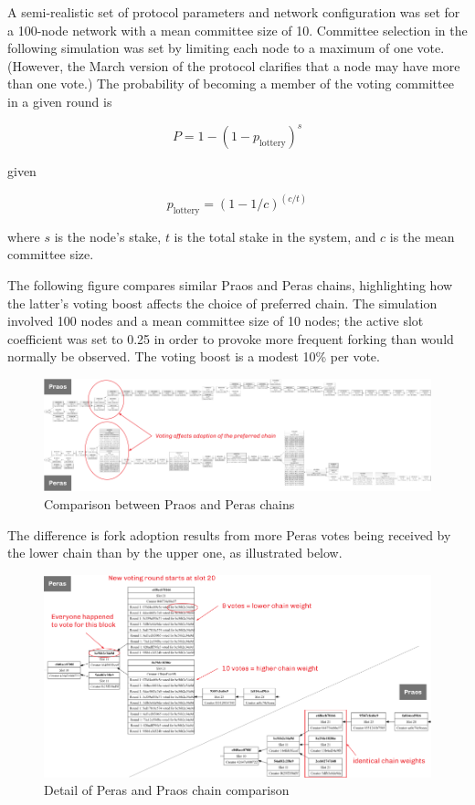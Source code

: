 \documentclass[10pt]{article}
\begin{document}
A semi-realistic set of protocol parameters and network configuration
was set for a 100-node network with a mean committee size of 10.
Committee selection in the following simulation was set by limiting each
node to a maximum of one vote. (However, the March version of the
protocol clarifies that a node may have more than one vote.) The
probability of becoming a member of the voting committee in a given
round is

\[
P = 1 - (1 - p_\text{lottery})^s
\]

given

\[
p_\text{lottery} = (1 - 1 / c)^{(c / t)}
\]

where \(s\) is the node's stake, \(t\) is the total stake in the system,
and \(c\) is the mean committee size.

The following figure compares similar Praos and Peras chains,
highlighting how the latter's voting boost affects the choice of
preferred chain. The simulation involved 100 nodes and a mean committee
size of 10 nodes; the active slot coefficient was set to 0.25 in order
to provoke more frequent forking than would normally be observed. The
voting boost is a modest 10\% per vote.

\begin{figure}
\centering
\includegraphics{../diagrams/sim-expts/peras-praos-comparison.png}
\caption{Comparison between Praos and Peras chains}
\end{figure}

The difference is fork adoption results from more Peras votes being
received by the lower chain than by the upper one, as illustrated below.

\begin{figure}
\centering
\includegraphics{../diagrams/sim-expts/peras-voting.png}
\caption{Detail of Peras and Praos chain comparison}
\end{figure}
\end{document}
